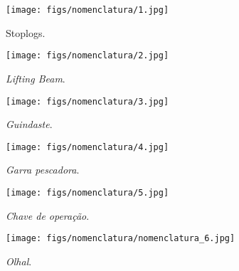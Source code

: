 \begin{figure}[H]
    \centering
    \texttt{[image: figs/nomenclatura/1.jpg]}
    \caption{Stoplogs.}
    \label{nomenclatura_1}
\end{figure}

\begin{figure}[H]
    \centering
    \texttt{[image: figs/nomenclatura/2.jpg]}
    \caption{\emph{Lifting Beam}.}
    \label{nomenclatura_2}
\end{figure}

\begin{figure}[H]
    \centering
    \texttt{[image: figs/nomenclatura/3.jpg]}
    \caption{\emph{Guindaste}.}
    \label{nomenclatura_3}
\end{figure}

\begin{figure}[H]
    \centering
    \texttt{[image: figs/nomenclatura/4.jpg]}
    \caption{\emph{Garra pescadora}.}
    \label{nomenclatura_4}
\end{figure}

\begin{figure}[H]
    \centering
    \texttt{[image: figs/nomenclatura/5.jpg]}
    \caption{\emph{Chave de operação}.}
    \label{nomenclatura_5}
\end{figure}

\begin{figure}[H]
    \centering
    \texttt{[image: figs/nomenclatura/nomenclatura\_6.jpg]}
    \caption{\emph{Olhal}.}
    \label{nomenclatura_6}
\end{figure}
